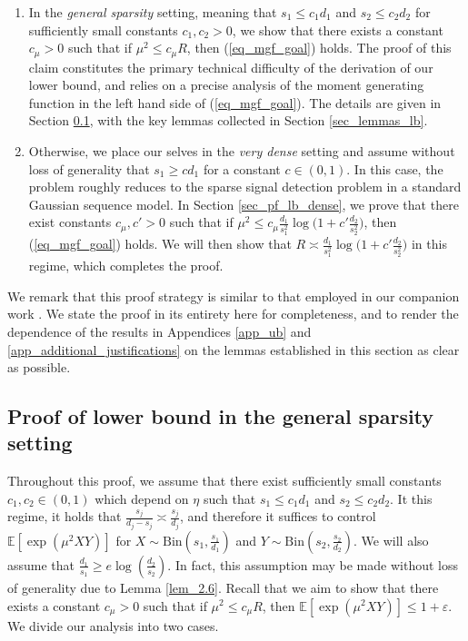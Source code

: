 \documentclass{article}
\newcommand{\EE}{\mathbb{E}}
\newcommand{\eps}{\varepsilon} %
\theoremstyle{remark}
\begin{document}
\begin{enumerate}
    \item In the \textit{general sparsity} setting, meaning that $s_1 \leq c_1 d_1$ and $s_2 \leq c_2 d_2$ for sufficiently small constants $c_1, c_2 > 0$, we show that there exists a constant $c_\mu > 0$ such that if $\mu^2 \leq c_\mu R$, then (\ref{eq_mgf_goal}) holds. The proof of this claim constitutes the primary technical difficulty of the derivation of our lower bound, and relies on a precise analysis of the moment generating function in the left hand side of (\ref{eq_mgf_goal}). The details are given in Section \ref{sec_pf_lb_general}, with the key lemmas collected in Section \ref{sec_lemmas_lb}.
    \item Otherwise, we place our selves in the \textit{very dense} setting and assume without loss of generality that $s_1 \geq c d_1$ for a constant $c \in (0,1)$. In this case, the problem roughly reduces to the sparse signal detection problem in a standard Gaussian sequence model. In Section \ref{sec_pf_lb_dense}, we prove that there exist constants $c_\mu,c' > 0$ such that if $\mu^2 \leq c_\mu \frac{d_1}{s_1^2}\log\big(1 + c'\frac{d_2}{s_2^2}\big)$, then (\ref{eq_mgf_goal}) holds. We will then show that $R \asymp \frac{d_1}{s_1^2}\log\big(1 + c'\frac{d_2}{s_2^2}\big)$ in this regime, which completes the proof.
\end{enumerate}
We remark that this proof strategy is similar to that employed in our companion work \citet{chhor2026optimal}. We state the proof in its entirety here for completeness, and to render the dependence of the results in Appendices \ref{app_ub} and \ref{app_additional_justifications} on the lemmas established in this section as clear as possible.
\subsection{Proof of lower bound in the general sparsity setting}\label{sec_pf_lb_general}
Throughout this proof, we assume that there exist sufficiently small constants $c_1, c_2 \in (0,1)$ which depend on $\eta$ such that $s_1 \leq c_1d_1$ and $s_2 \leq c_2d_2$. It this regime, it holds that $\frac{s_j}{d_j - s_j} \asymp \frac{s_j}{d_j}$, and therefore it suffices to control $\EE[\exp(\mu^2XY)]$ for $X \sim \text{Bin}(s_1, \frac{s_1}{d_1})$ and $Y \sim \text{Bin}(s_2, \frac{s_2}{d_2})$. We will also assume that $\frac{d_1}{s_1} \geq e \log(\frac{d_2}{s_2})$. In fact, this assumption may be made without loss of generality due to Lemma \ref{lem_2.6}. Recall that we aim to show that there exists a constant $c_\mu > 0$ such that if $\mu^2 \leq c_\mu R$, then $\EE[\exp(\mu^2XY)] \leq 1 + \eps$. We divide our analysis into two cases.
\end{document}
